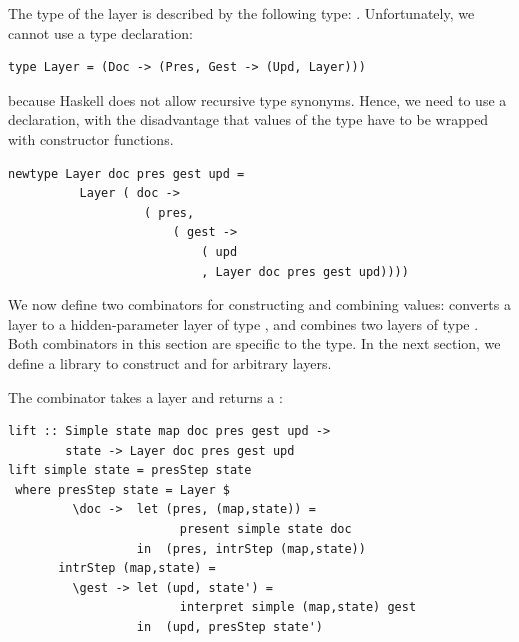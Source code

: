 \documentclass[preprint,natbib]{sigplanconf}
\begin{document}
The type of the layer is described by the following type: 
.  Unfortunately, we cannot use a type declaration: 

\begin{small}
\begin{verbatim}
type Layer = (Doc -> (Pres, Gest -> (Upd, Layer)))
\end{verbatim}
\end{small}


because Haskell does not allow recursive type synonyms. Hence, we need to use a  declaration, with the disadvantage that values of the type have to be wrapped with constructor functions.

\begin{small}
\begin{verbatim}
newtype Layer doc pres gest upd = 
          Layer ( doc -> 
                   ( pres, 
                       ( gest -> 
                           ( upd 
                           , Layer doc pres gest upd))))
\end{verbatim}
\end{small}

We now define two combinators for constructing and combining  values:  converts  a  layer to a hidden-parameter layer of type , and  combines two layers of type . Both combinators in this section are specific to the  type. In the next section, we define a library to construct  and  for arbitrary layers.



The combinator  takes a  layer and returns a :

\begin{small}
\begin{verbatim}
lift :: Simple state map doc pres gest upd ->
        state -> Layer doc pres gest upd
lift simple state = presStep state 
 where presStep state = Layer $
         \doc ->  let (pres, (map,state)) = 
                        present simple state doc                                         
                  in  (pres, intrStep (map,state))
       intrStep (map,state) =
         \gest -> let (upd, state') = 
                        interpret simple (map,state) gest                     
                  in  (upd, presStep state')
\end{verbatim}%
\end{small}
\end{document}
